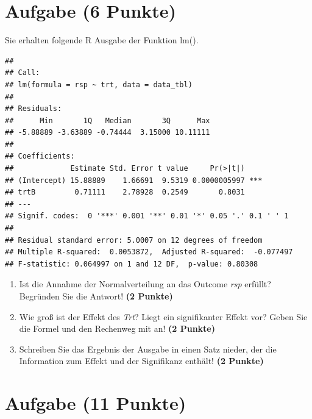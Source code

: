 \documentclass[a4paper, 10pt]{scrartcl}\usepackage[]{graphicx}\usepackage[]{xcolor}
\makeatletter
\newenvironment{kframe}{%
 \def\at@end@of@kframe{}%
 \ifinner\ifhmode%
  \def\at@end@of@kframe{\end{minipage}}%
  \begin{minipage}{\columnwidth}%
 \fi\fi%
 \def\FrameCommand##1{\hskip\@totalleftmargin \hskip-\fboxsep
 \colorbox{shadecolor}{##1}\hskip-\fboxsep
     \hskip-\linewidth \hskip-\@totalleftmargin \hskip\columnwidth}%
 \MakeFramed {\advance\hsize-\width
   \@totalleftmargin\z@ \linewidth\hsize
   \@setminipage}}%
 {\par\unskip\endMakeFramed%
 \at@end@of@kframe}
\newenvironment{knitrout}{}{} %
\makeatother
\begin{document}
\clearpage

\section{Aufgabe \hfill (6 Punkte)}

Sie erhalten folgende R Ausgabe der Funktion lm().

\begin{knitrout}
\color{fgcolor}\begin{kframe}
\begin{verbatim}
## 
## Call:
## lm(formula = rsp ~ trt, data = data_tbl)
## 
## Residuals:
##      Min       1Q   Median       3Q      Max 
## -5.88889 -3.63889 -0.74444  3.15000 10.11111 
## 
## Coefficients:
##             Estimate Std. Error t value     Pr(>|t|)    
## (Intercept) 15.88889    1.66691  9.5319 0.0000005997 ***
## trtB         0.71111    2.78928  0.2549       0.8031    
## ---
## Signif. codes:  0 '***' 0.001 '**' 0.01 '*' 0.05 '.' 0.1 ' ' 1
## 
## Residual standard error: 5.0007 on 12 degrees of freedom
## Multiple R-squared:  0.0053872,	Adjusted R-squared:  -0.077497 
## F-statistic: 0.064997 on 1 and 12 DF,  p-value: 0.80308
\end{verbatim}
\end{kframe}
\end{knitrout}


\begin{enumerate}
\item Ist die Annahme der Normalverteilung an das Outcome \textit{rsp} erf{\"u}llt?
  Begr{\"u}nden Sie die Antwort! \textbf{(2 Punkte)}
\item Wie gro{\ss} ist der Effekt des \textit{Trt}? Liegt ein signifikanter
  Effekt vor? Geben Sie die Formel und den Rechenweg mit an! \textbf{(2 Punkte)}
\item Schreiben Sie das Ergebnis der \Rlogo Ausgabe in einen Satz nieder, der die
  Information zum Effekt und der Signifikanz enth{\"a}lt! \textbf{(2 Punkte)} 
\end{enumerate}
 
\clearpage

\section{Aufgabe \hfill (11 Punkte)}
\end{document}
